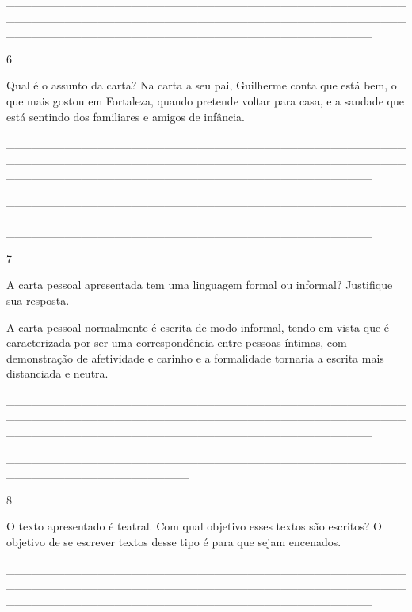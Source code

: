 \begin{itemize}
\_\_\_\_\_\_\_\_\_\_\_\_\_\_\_\_\_\_\_\_\_\_\_\_\_\_\_\_\_\_\_\_\_\_\_\_\_\_\_\_\_\_\_\_\_\_\_\_\_\_\_\_\_\_\_\_\_\_\_\_\_\_\_\_\_\_\_\_\_\_\_\_\_\_\_\_\_\_\_\_\_\_\_\_\_\_\_\_\_\_\_\_\_\_\_\_\_\_\_\_\_\_\_\_\_\_\_\_\_\_\_\_\_\_\_\_\_\_\_\_\_\_\_\_\_\_\_\_\_\_\_\_\_\_\_\_\_\_\_\_

\num{6}

Qual é o assunto da carta? Na carta a seu pai, Guilherme conta que está
bem, o que mais gostou em Fortaleza, quando pretende voltar para casa, e
a saudade que está sentindo dos familiares e amigos de infância.

\protect\hypertarget{_Hlk127362551}{}{}\_\_\_\_\_\_\_\_\_\_\_\_\_\_\_\_\_\_\_\_\_\_\_\_\_\_\_\_\_\_\_\_\_\_\_\_\_\_\_\_\_\_\_\_\_\_\_\_\_\_\_\_\_\_\_\_\_\_\_\_\_\_\_\_\_\_\_\_\_\_\_\_\_\_\_\_\_\_\_\_\_\_\_\_\_\_\_\_\_\_\_\_\_\_\_\_\_\_\_\_\_\_\_\_\_\_\_\_\_\_\_\_\_\_\_\_\_\_\_\_\_\_\_\_\_\_\_\_\_\_\_\_\_\_\_\_\_\_\_\_

\_\_\_\_\_\_\_\_\_\_\_\_\_\_\_\_\_\_\_\_\_\_\_\_\_\_\_\_\_\_\_\_\_\_\_\_\_\_\_\_\_\_\_\_\_\_\_\_\_\_\_\_\_\_\_\_\_\_\_\_\_\_\_\_\_\_\_\_\_\_\_\_\_\_\_\_\_\_\_\_\_\_\_\_\_\_\_\_\_\_\_\_\_\_\_\_\_\_\_\_\_\_\_\_\_\_\_\_\_\_\_\_\_\_\_\_\_\_\_\_\_\_\_\_\_\_\_\_\_\_\_\_\_\_\_\_\_\_\_\_

\num{7}

A carta pessoal apresentada tem uma linguagem formal ou informal?
Justifique sua resposta.

A carta pessoal normalmente é escrita de modo informal, tendo em vista
que é caracterizada por ser uma correspondência entre pessoas íntimas,
com demonstração de afetividade e carinho e a formalidade tornaria a
escrita mais distanciada e neutra.

\_\_\_\_\_\_\_\_\_\_\_\_\_\_\_\_\_\_\_\_\_\_\_\_\_\_\_\_\_\_\_\_\_\_\_\_\_\_\_\_\_\_\_\_\_\_\_\_\_\_\_\_\_\_\_\_\_\_\_\_\_\_\_\_\_\_\_\_\_\_\_\_\_\_\_\_\_\_\_\_\_\_\_\_\_\_\_\_\_\_\_\_\_\_\_\_\_\_\_\_\_\_\_\_\_\_\_\_\_\_\_\_\_\_\_\_\_\_\_\_\_\_\_\_\_\_\_\_\_\_\_\_\_\_\_\_\_\_\_\_

\_\_\_\_\_\_\_\_\_\_\_\_\_\_\_\_\_\_\_\_\_\_\_\_\_\_\_\_\_\_\_\_\_\_\_\_\_\_\_\_\_\_\_\_\_\_\_\_\_\_\_\_\_\_\_\_\_\_\_\_\_\_\_\_\_\_\_\_\_\_

\num{8}

O texto apresentado é teatral. Com qual objetivo esses textos são
escritos? O objetivo de se escrever textos desse tipo é para que sejam
encenados.

\_\_\_\_\_\_\_\_\_\_\_\_\_\_\_\_\_\_\_\_\_\_\_\_\_\_\_\_\_\_\_\_\_\_\_\_\_\_\_\_\_\_\_\_\_\_\_\_\_\_\_\_\_\_\_\_\_\_\_\_\_\_\_\_\_\_\_\_\_\_\_\_\_\_\_\_\_\_\_\_\_\_\_\_\_\_\_\_\_\_\_\_\_\_\_\_\_\_\_\_\_\_\_\_\_\_\_\_\_\_\_\_\_\_\_\_\_\_\_\_\_\_\_\_\_\_\_\_\_\_\_\_\_\_\_\_\_\_\_\_


\end{itemize}
